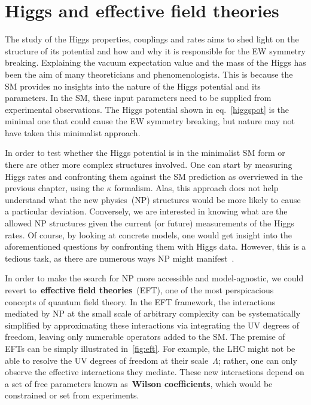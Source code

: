 \chapter{Higgs and effective field theories }\label{chap:HiggsEFT}
\par The study of the Higgs properties, couplings and rates aims to shed light on the structure of its potential and how and why it is responsible for the EW symmetry breaking. Explaining the vacuum expectation value and the mass of the Higgs has been the aim of many theoreticians and phenomenologists. This is because the SM provides no insights into the nature of the Higgs potential and its parameters.  In the SM, these input parameters need to be supplied from experimental observations. The Higgs potential shown in eq.~\eqref{higgspot} is the minimal one that could cause the EW symmetry breaking, but nature may not have taken this minimalist approach. 
\par  In order to test whether the Higgs potential is in the minimalist SM form or there are other more complex structures involved. One can start by measuring Higgs rates and confronting them against the SM prediction as overviewed in the previous chapter, using the $\kappa$ formalism.  Alas, this approach does not help understand what the new physics~(NP) structures would be more likely to cause a particular deviation. Conversely, we are interested in knowing what are the allowed NP structures given the current (or future) measurements of the Higgs rates.  Of course, by looking at concrete models, one would get insight into the aforementioned questions by confronting them with Higgs data. However, this is a  tedious task, as there are numerous ways NP might manifest~. 
\par In order to make the search for NP more accessible and model-agnostic, we could revert to~\textbf{effective field theories}~(EFT), one of the most perspicacious concepts of quantum field theory. In the EFT framework, the interactions mediated by  NP at the small scale of arbitrary complexity can be systematically simplified by approximating these interactions via integrating the UV degrees of freedom, leaving only numerable operators added to the SM. The premise of EFTs can be simply illustrated in~\autoref{fig:eft}.  For example, the LHC might not be able to resolve the UV degrees of freedom at their scale~$\Lambda$; rather, one can only observe the effective interactions they mediate. These new interactions depend on a set of free parameters known as~\textbf{Wilson coefficients}, which would be constrained or set from experiments. 
